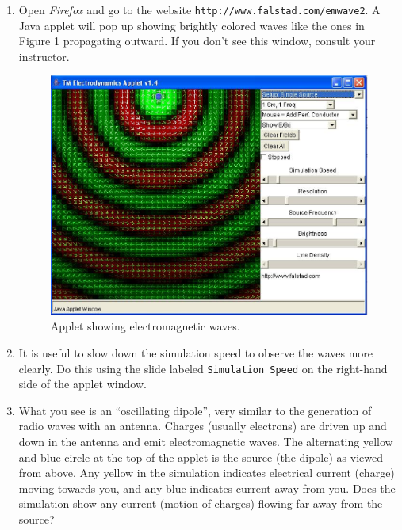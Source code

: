 \begin{enumerate}

\item Open {\it Firefox} and go to the website
{\tt \verb!http://www.falstad.com/emwave2!}. A Java applet will pop up showing
brightly colored waves like the ones in Figure 1 propagating outward. 
If you don't see this window, consult your instructor.
\begin{figure}[hbt]
\begin{center}
\includegraphics[width=6.0in]{plane_waves/emwaves1.eps}
\caption{Applet showing electromagnetic waves.}
\end{center}
\end{figure}

\item It is useful to slow down the simulation speed to observe the waves more clearly.
Do this using the slide labeled
{\tt Simulation Speed} on the right-hand side of the applet window.

\item What you see is an ``oscillating dipole'', very similar to the generation of radio waves with an antenna.
Charges (usually electrons) are driven up and down in the antenna and emit electromagnetic 
waves.  
The alternating yellow and blue circle at the top of the applet is the source (the dipole)
as viewed from above.  Any yellow in the simulation indicates electrical current (charge) moving towards you, and any blue indicates current away from you.  Does the simulation show any current (motion of charges) flowing far away from the source?
\vspace{1.5cm}


\end{enumerate}
